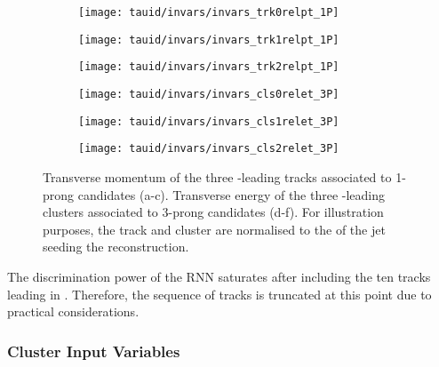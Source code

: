 \begin{figure}[htbp]
  \centering

  \begin{subfigure}{0.33\textwidth}
    \texttt{[image: tauid/invars/invars\_trk0relpt\_1P]}
    \subcaption{}%
    \label{fig:tauid_low_level_variables_track0}
  \end{subfigure}%
  \begin{subfigure}{0.33\textwidth}
    \texttt{[image: tauid/invars/invars\_trk1relpt\_1P]}
    \subcaption{}%
    \label{fig:tauid_low_level_variables_track1}
  \end{subfigure}%
  \begin{subfigure}{0.33\textwidth}
    \texttt{[image: tauid/invars/invars\_trk2relpt\_1P]}
    \subcaption{}%
    \label{fig:tauid_low_level_variables_track2}
  \end{subfigure}

  \begin{subfigure}{0.33\textwidth}
    \texttt{[image: tauid/invars/invars\_cls0relet\_3P]}
    \subcaption{}%
    \label{fig:tauid_low_level_variables_cluster0}
  \end{subfigure}%
  \begin{subfigure}{0.33\textwidth}
    \texttt{[image: tauid/invars/invars\_cls1relet\_3P]}
    \subcaption{}%
    \label{fig:tauid_low_level_variables_cluster1}
  \end{subfigure}%
  \begin{subfigure}{0.33\textwidth}
    \texttt{[image: tauid/invars/invars\_cls2relet\_3P]}
    \subcaption{}%
    \label{fig:tauid_low_level_variables_cluster2}
  \end{subfigure}

  \caption{Transverse momentum of the three \pT-leading tracks
    associated to 1-prong \tauhadvis candidates (a-c). Transverse
    energy of the three \ET-leading clusters associated to 3-prong
    \tauhadvis candidates (d-f). For illustration purposes, the track
    \pT and cluster \ET are normalised to the \pT of the jet seeding
    the \tauhadvis reconstruction.}%
  \label{fig:tauid_low_level_variables}
\end{figure}

The discrimination power of the RNN \tauid saturates after including
the ten tracks leading in \pT. Therefore, the sequence of tracks is
truncated at this point due to practical considerations.


\subsubsection{Cluster Input Variables}

